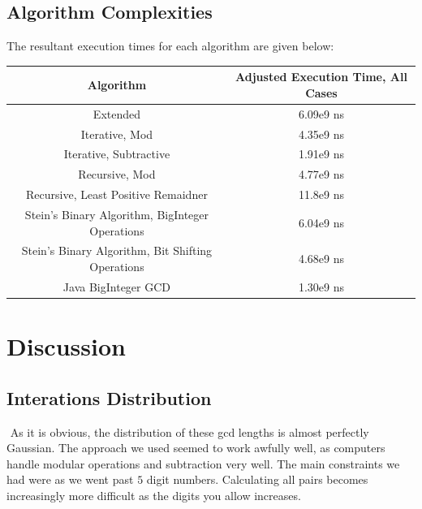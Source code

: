 \documentclass[11pt]{article}
\begin{document}
\subsection{Algorithm Complexities}
The resultant execution times for each algorithm are given below:
\begin{center}

\begin{tabular}{|c|c|}
\hline
	\textbf{Algorithm} & \textbf{Adjusted Execution Time, All Cases}
	\\
	\hline Extended & 6.09e9 ns\\
	\hline Iterative, Mod & 4.35e9 ns\\
	\hline Iterative, Subtractive & 1.91e9 ns\\
	\hline Recursive, Mod & 4.77e9 ns\\
	\hline Recursive, Least Positive Remaidner
 & 11.8e9 ns\\
	\hline Stein’s Binary Algorithm, BigInteger Operations & 6.04e9 ns\\
	\hline Stein’s Binary Algorithm, Bit Shifting Operations & 4.68e9 ns\\
	\hline Java BigInteger GCD & 1.30e9 ns\\
	\hline
\end{tabular}

\end{center}
	
	

\section{Discussion}
\subsection{Interations Distribution}$ $
\indent As it is obvious, the distribution of these gcd lengths is almost perfectly Gaussian. The approach we used seemed to work awfully well, as computers handle modular operations and subtraction very well. The main constraints we had were as we went past $5$ digit numbers. Calculating all pairs becomes increasingly more difficult as the digits you allow increases. 
\end{document}
